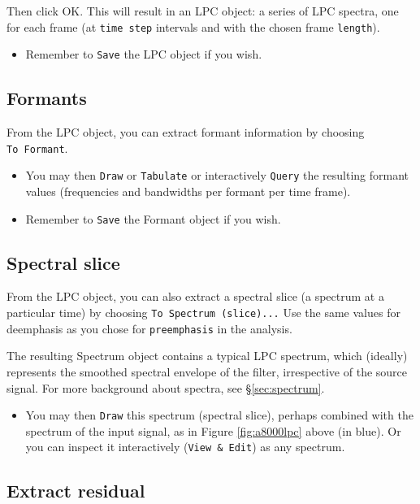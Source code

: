 \documentclass[
]{book}
\providecommand{\tightlist}{%
  \setlength{\itemsep}{0pt}\setlength{\parskip}{0pt}}
\begin{document}
Then click OK. This will result in an LPC object: a series of LPC spectra, one for each frame (at \texttt{time\ step} intervals and with the chosen frame \texttt{length}).

\begin{itemize}
\tightlist
\item
  Remember to \texttt{Save} the LPC object if you wish.
\end{itemize}

\subsection{Formants}\label{formants}

From the LPC object, you can extract formant information by choosing \texttt{To\ Formant}.

\begin{itemize}
\item
  You may then \texttt{Draw} or \texttt{Tabulate} or interactively \texttt{Query} the resulting formant values (frequencies and bandwidths per formant per time frame).
\item
  Remember to \texttt{Save} the Formant object if you wish.
\end{itemize}

\subsection{Spectral slice}\label{sec:LPC-spectralslice}

From the LPC object, you can also extract a spectral slice (a spectrum at a particular time) by choosing \texttt{To\ Spectrum\ (slice)...} Use the same values for deemphasis as you chose for \texttt{preemphasis} in the analysis.

The resulting Spectrum object contains a typical LPC spectrum, which (ideally) represents the smoothed spectral envelope of the filter, irrespective of the source signal. For more background about spectra, see §\ref{sec:spectrum}.

\begin{itemize}
\tightlist
\item
  You may then \texttt{Draw} this spectrum (spectral slice), perhaps combined with the spectrum of the input signal, as in Figure \ref{fig:a8000lpc} above (in blue). Or you can inspect it interactively (\texttt{View\ \&\ Edit}) as any spectrum.
\end{itemize}

\subsection{Extract residual}\label{extract-residual}
\end{document}
